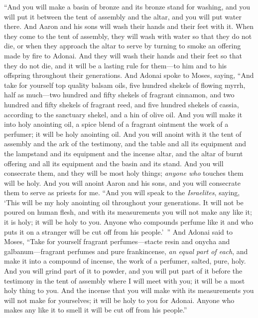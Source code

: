\begin{biblechapter}
\verse “And you will make a basin of bronze and its bronze stand for washing, and you will put it between the tent of assembly and the altar, and you will put water there.
\verse And Aaron and his sons will wash their hands and their feet with it.
\verse When they come to the tent of assembly, they will wash with water so that they do not die, or when they approach the altar to serve by turning to smoke an offering made by fire to Adonai.
\verse And they will wash their hands and their feet so that they do not die, and it will be a lasting rule for them—to him and to his offspring throughout their generations.
 And Adonai spoke to Moses, saying,
\verse “And take for yourself top quality balsam oils, five hundred shekels of flowing myrrh, half as much—two hundred and fifty shekels of fragrant cinnamon, and two hundred and fifty shekels of fragrant reed,
\verse and five hundred shekels of cassia, according to the sanctuary shekel, and a hin of olive oil.
\verse And you will make it into holy anointing oil, a spice blend of a fragrant ointment the work of a perfumer; it will be holy anointing oil.
\verse And you will anoint with it the tent of assembly and the ark of the testimony,
\verse and the table and all its equipment and the lampstand and its equipment and the incense altar,
\verse and the altar of burnt offering and all its equipment and the basin and its stand.
\verse And you will consecrate them, and they will be most holy things; \textit{anyone who} touches them will be holy.
\verse And you will anoint Aaron and his sons, and you will consecrate them to serve as priests for me.
\verse “And you will speak to the \textit{Israelites}, saying, ‘This will be my holy anointing oil throughout your generations.
\verse It will not be poured on human flesh, and with its measurements you will not make any like it; it is holy; it will be holy to you.
\verse Anyone who compounds perfume like it and who puts it on a stranger will be cut off from his people.’ ”
\verse And Adonai said to Moses, “Take for yourself fragrant perfumes—stacte resin and onycha and galbanum—fragrant perfumes and pure frankincense, \textit{an equal part of each},
\verse and make it into a compound of incense, the work of a perfumer, salted, pure, holy.
\verse And you will grind part of it to powder, and you will put part of it before the testimony in the tent of assembly where I will meet with you; it will be a most holy thing to you.
\verse And the incense that you will make with its measurements you will not make for yourselves; it will be holy to you for Adonai.
\verse Anyone who makes any like it to smell it will be cut off from his people.”
\end{biblechapter}

